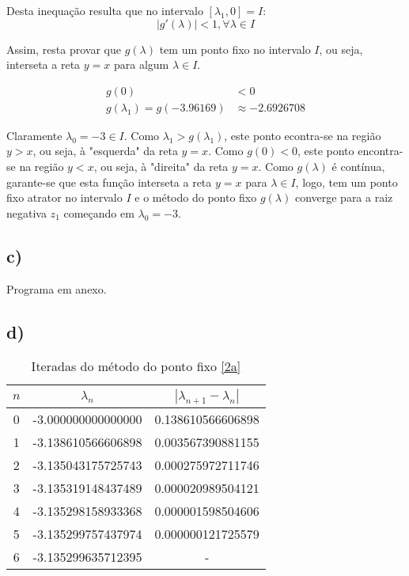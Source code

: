 \documentclass[a4paper, 18pt]{article}
\begin{document}
	Desta inequação resulta que no intervalo $[\lambda_1, 0] = I$:
		$$|g'(\lambda)| < 1, \forall \lambda \in I$$

	\par
	Assim, resta provar que $g(\lambda)$ tem um ponto fixo no intervalo $I$, ou seja, interseta a reta $y = x$ para algum $\lambda \in I$.

	\begin{align*}
		g(0) &< 0 \\
		g(\lambda_1) = g(-3.96169) &\approx -2.6926708
	\end{align*}

	Claramente $\lambda_0 = -3 \in I$. Como $\lambda_1 > g(\lambda_1)$, este ponto econtra-se na região $y > x$, ou seja, à "esquerda" da reta $y = x$. Como $g(0) < 0$, este ponto encontra-se na região $y < x$, ou seja, à "direita" da reta $y = x$. Como $g(\lambda)$ é contínua, garante-se que esta função interseta a reta $y = x$ para $\lambda \in I$, logo, tem um ponto fixo atrator no intervalo $I$ e o método do ponto fixo $g(\lambda)$ converge para a raiz negativa $z_1$ começando em $\lambda_0 = -3$.

\subsection*{c)}
	Programa em anexo.

\subsection*{d)}
	\begin{table}[H]
		\setlength{\tabcolsep}{0.5cm} %
		\renewcommand{\arraystretch}{1.5} %
		\centering
		\caption{Iteradas do método do ponto fixo \eqref{2a}}
		\label{2d_table}
		\begin{tabular}{|c|c|c|}
			$n$ & $\lambda _n$ &  $| \lambda _{n+1} - \lambda _n |$ \\\hline
			0& -3.000000000000000 & 0.138610566606898 \\
			1& -3.138610566606898 & 0.003567390881155 \\
			2& -3.135043175725743 & 0.000275972711746 \\
			3& -3.135319148437489 & 0.000020989504121 \\
			4& -3.135298158933368 & 0.000001598504606 \\
			5& -3.135299757437974 & 0.000000121725579 \\
			6& -3.135299635712395 & - \\
		\end{tabular}
	\end{table}
\end{document}
